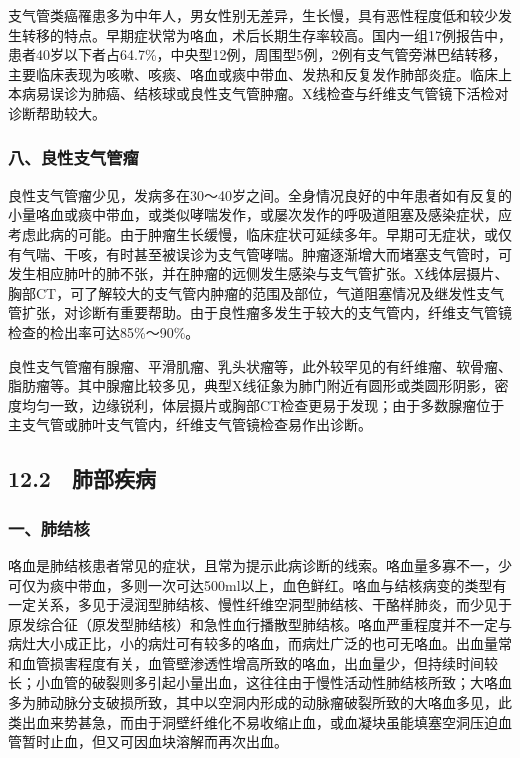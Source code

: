 支气管类癌罹患多为中年人，男女性别无差异，生长慢，具有恶性程度低和较少发生转移的特点。早期症状常为咯血，术后长期生存率较高。国内一组17例报告中，患者40岁以下者占64.7\%，中央型12例，周围型5例，2例有支气管旁淋巴结转移，主要临床表现为咳嗽、咳痰、咯血或痰中带血、发热和反复发作肺部炎症。临床上本病易误诊为肺癌、结核球或良性支气管肿瘤。X线检查与纤维支气管镜下活检对诊断帮助较大。

\subsubsection{八、良性支气管瘤}

良性支气管瘤少见，发病多在30～40岁之间。全身情况良好的中年患者如有反复的小量咯血或痰中带血，或类似哮喘发作，或屡次发作的呼吸道阻塞及感染症状，应考虑此病的可能。由于肿瘤生长缓慢，临床症状可延续多年。早期可无症状，或仅有气喘、干咳，有时甚至被误诊为支气管哮喘。肿瘤逐渐增大而堵塞支气管时，可发生相应肺叶的肺不张，并在肿瘤的远侧发生感染与支气管扩张。X线体层摄片、胸部CT，可了解较大的支气管内肿瘤的范围及部位，气道阻塞情况及继发性支气管扩张，对诊断有重要帮助。由于良性瘤多发生于较大的支气管内，纤维支气管镜检查的检出率可达85\%～90\%。

良性支气管瘤有腺瘤、平滑肌瘤、乳头状瘤等，此外较罕见的有纤维瘤、软骨瘤、脂肪瘤等。其中腺瘤比较多见，典型X线征象为肺门附近有圆形或类圆形阴影，密度均匀一致，边缘锐利，体层摄片或胸部CT检查更易于发现；由于多数腺瘤位于主支气管或肺叶支气管内，纤维支气管镜检查易作出诊断。

\protect\hypertarget{text00058.html}{}{}

\subsection{12.2　肺部疾病}

\subsubsection{一、肺结核}

咯血是肺结核患者常见的症状，且常为提示此病诊断的线索。咯血量多寡不一，少可仅为痰中带血，多则一次可达500ml以上，血色鲜红。咯血与结核病变的类型有一定关系，多见于浸润型肺结核、慢性纤维空洞型肺结核、干酪样肺炎，而少见于原发综合征（原发型肺结核）和急性血行播散型肺结核。咯血严重程度并不一定与病灶大小成正比，小的病灶可有较多的咯血，而病灶广泛的也可无咯血。出血量常和血管损害程度有关，血管壁渗透性增高所致的咯血，出血量少，但持续时间较长；小血管的破裂则多引起小量出血，这往往由于慢性活动性肺结核所致；大咯血多为肺动脉分支破损所致，其中以空洞内形成的动脉瘤破裂所致的大咯血多见，此类出血来势甚急，而由于洞壁纤维化不易收缩止血，或血凝块虽能填塞空洞压迫血管暂时止血，但又可因血块溶解而再次出血。

